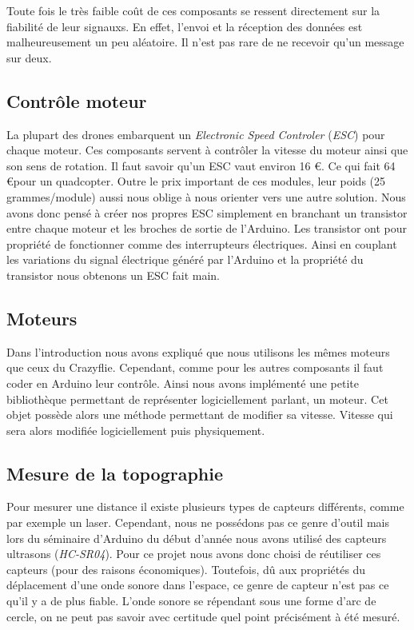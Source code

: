 \documentclass[a4paper,10pt]{report}
\begin{document}
	Toute fois le très faible coût de ces composants se ressent directement 
sur la fiabilité de leur signauxs. En effet, l'envoi et la réception des 
données est malheureusement un peu aléatoire. Il n'est pas rare de ne recevoir 
qu'un message sur deux.
	
      
      \subsection{Contrôle moteur}
	La plupart des drones embarquent un \textit{Electronic Speed Controler} 
(\textit{ESC}) pour chaque moteur. Ces composants servent à contrôler la 
vitesse du moteur ainsi que son sens de rotation. Il faut savoir qu'un ESC vaut 
environ 16 \euro. Ce qui fait 64 \euro \space pour un quadcopter. Outre le prix 
important de ces modules, leur poids (25 grammes/module) aussi nous oblige à 
nous orienter vers une autre solution. Nous avons donc pensé à créer nos 
propres 
ESC simplement en branchant un transistor entre chaque moteur et les broches de 
sortie de l’Arduino. Les transistor ont pour propriété de fonctionner comme des 
interrupteurs électriques. Ainsi en couplant les variations du signal 
électrique généré par l'Arduino et la propriété du transistor nous obtenons un 
ESC fait main.

      \subsection{Moteurs}
	Dans l'introduction nous avons expliqué que nous utilisons les mêmes 
moteurs que ceux du Crazyflie. Cependant, comme pour les autres composants il 
faut coder en Arduino leur contrôle. Ainsi nous avons implémenté une petite 
bibliothèque permettant de représenter logiciellement parlant, un moteur. Cet 
objet possède alors une méthode permettant de modifier sa vitesse. Vitesse qui 
sera alors modifiée logiciellement puis physiquement.

      \subsection{Mesure de la topographie}
	Pour mesurer une distance il existe plusieurs types de capteurs 
différents, comme par exemple un laser. Cependant, nous ne possédons pas ce 
genre d'outil mais lors du séminaire d'Arduino du début d'année nous avons 
utilisé des capteurs ultrasons (\textit{HC-SR04}). Pour ce projet nous avons 
donc choisi de réutiliser ces capteurs (pour des raisons économiques). 
Toutefois, dû aux propriétés du déplacement d'une onde sonore dans l'espace, ce 
genre de capteur n'est pas ce qu'il y a de plus fiable. L'onde sonore se 
répendant sous une forme d'arc de cercle, on ne peut pas savoir avec certitude 
quel point précisément à été mesuré.
\end{document}
